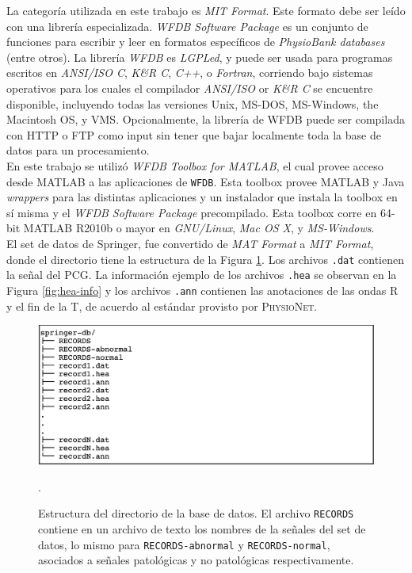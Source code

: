 \indent La categoría utilizada en este trabajo es \textit{MIT Format}. Este formato debe ser leído con una librería
especializada. \textit{WFDB Software Package} es un conjunto de funciones para escribir y leer en formatos
específicos de \textit{PhysioBank databases} (entre otros). La librería \textit{WFDB} es \textit{LGPLed}, y puede
ser usada para programas escritos en \textit{ANSI/ISO C}, \textit{K\&R C}, \textit{C++}, o \textit{Fortran},
corriendo bajo sistemas operativos para los cuales el compilador \textit{ANSI/ISO} or \textit{K\&R C} se encuentre
disponible, incluyendo todas las versiones Unix, MS-DOS, MS-Windows, the Macintosh OS, y VMS. Opcionalmente, la
librería de WFDB puede ser compilada con HTTP o FTP como input sin tener que bajar localmente toda la base de datos
para un procesamiento. \\
\indent En este trabajo se utilizó \textit{WFDB Toolbox for MATLAB\texttrademark}, el cual provee acceso desde
\textsc{MATLAB\texttrademark} a las aplicaciones de \texttt{WFDB}. Esta toolbox provee \textsc{MATLAB\texttrademark} y
Java
\textit{wrappers} para las distintas aplicaciones y un instalador que instala la toolbox en sí misma y el
\textit{WFDB Software Package} precompilado. Esta toolbox corre en 64-bit \textsc{MATLAB\texttrademark} R2010b o
mayor en \textit{GNU/Linux}, \textit{Mac OS X}, y \textit{MS-Windows}. \\
\indent El set de datos de Springer, fue convertido de \textit{MAT Format} a \textit{MIT Format}, donde el
directorio tiene la estructura de la Figura \ref{fig:springer-db}. Los archivos \texttt{.dat} contienen la señal del
PCG. La información ejemplo de los archivos \texttt{.hea} se observan en la Figura \ref{fig:hea-info} y los archivos
\texttt{.ann} contienen las anotaciones de las ondas R y el fin de la T, de acuerdo al estándar provisto por
\textsc{PhysioNet}.

\begin{figure}[H]
  \centering
  \includegraphics[scale=0.73]{sections/chapter-03/images/springer-db.png}
  \caption[Estructura del directorio de la base de datos.]{Estructura del directorio de la base de datos. El
  archivo \texttt{RECORDS} contiene en un archivo de texto los nombres de la señales del set de datos, lo mismo
  para \texttt{RECORDS-abnormal} y \texttt{RECORDS-normal}, asociados a señales patológicas y no patológicas
  respectivamente.}.
  \label{fig:springer-db}
\end{figure}

